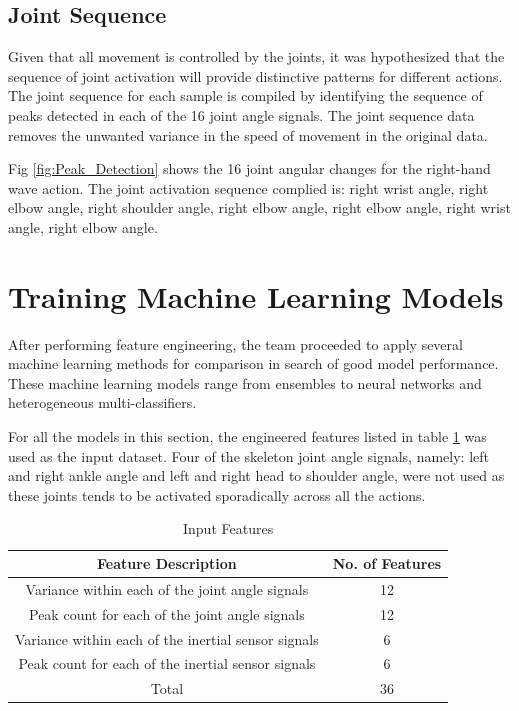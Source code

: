 \documentclass[conference]{IEEEtran}
\begin{document}
\subsection{Joint Sequence}

Given that all movement is controlled by the joints, it
was hypothesized that the sequence of joint activation
will provide distinctive patterns for different actions.
The joint sequence for each sample is compiled by
identifying the sequence of peaks detected in each of the
16 joint angle signals. The joint sequence data removes the
unwanted variance in the speed of movement in the original
data.

Fig \ref{fig:Peak_Detection} shows the 16 joint angular changes for the right-hand wave action. The joint activation sequence complied is: right wrist angle, right elbow angle, right shoulder angle, right elbow angle, right elbow angle, right wrist angle, right elbow angle.

\section{Training Machine Learning Models}

After performing feature engineering, the team proceeded to apply several machine learning methods for comparison in search of good model performance. These machine learning models range from ensembles to neural networks and heterogeneous multi-classifiers.

For all the models in this section, the engineered features listed in table \ref{tbl:input_features} was used as the input dataset. Four of the skeleton joint angle signals, namely: left and right ankle angle and left and right head to shoulder angle, were not used as these joints tends to be activated sporadically across all the actions.    

\begin{table}[H] 
\begin{center}
\caption{Input Features} \label{tbl:input_features}
\begin{tabular}{|c|c|}
\hline
Feature Description & No. of Features \\
\hline
Variance within each of the joint angle signals  & 12  \\
\hline
Peak count for each of the  joint angle signals & 12  \\
\hline
Variance within each of the inertial sensor signals & 6  \\
\hline
Peak count for each of the inertial sensor signals & 6  \\
\hline
Total & 36  \\
\hline
\end{tabular}
\end{center}
\end{table}
\end{document}
